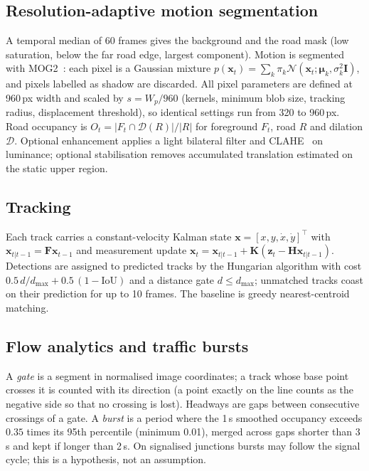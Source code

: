 \documentclass[10pt,twocolumn,a4paper]{article}
\begin{document}
\subsection{Resolution-adaptive motion segmentation}
A temporal median of 60 frames gives the background and the road mask (low saturation, below the far road edge, largest component).
Motion is segmented with MOG2~\cite{zivkovic2004}: each pixel is a Gaussian mixture $p(\mathbf{x}_t)=\sum_k\pi_k\mathcal{N}(\mathbf{x}_t;\boldsymbol\mu_k,\sigma_k^2\mathbf{I})$, and pixels labelled as shadow are discarded.
All pixel parameters are defined at 960\,px width and scaled by $s=W_p/960$ (kernels, minimum blob size, tracking radius, displacement threshold), so identical settings run from 320 to 960\,px.
Road occupancy is $O_t=|F_t\cap\mathcal{D}(R)|/|R|$ for foreground $F_t$, road $R$ and dilation $\mathcal{D}$.
Optional enhancement applies a light bilateral filter and CLAHE~\cite{zuiderveld1994,tomasi1998} on luminance; optional stabilisation removes accumulated translation estimated on the static upper region.

\subsection{Tracking}
Each track carries a constant-velocity Kalman state $\mathbf{x}=[x,y,\dot x,\dot y]^{\top}$ with $\mathbf{x}_{t|t-1}=\mathbf{F}\mathbf{x}_{t-1}$ and measurement update $\mathbf{x}_t=\mathbf{x}_{t|t-1}+\mathbf{K}(\mathbf{z}_t-\mathbf{H}\mathbf{x}_{t|t-1})$.
Detections are assigned to predicted tracks by the Hungarian algorithm with cost $0.5\,d/d_{\max}+0.5\,(1-\mathrm{IoU})$ and a distance gate $d\le d_{\max}$; unmatched tracks coast on their prediction for up to 10 frames.
The baseline is greedy nearest-centroid matching.

\subsection{Flow analytics and traffic bursts}
A \emph{gate} is a segment in normalised image coordinates; a track whose base point crosses it is counted with its direction (a point exactly on the line counts as the negative side so that no crossing is lost).
Headways are gaps between consecutive crossings of a gate. A \emph{burst} is a period where the 1\,s smoothed occupancy exceeds $0.35$ times its 95th percentile (minimum 0.01), merged across gaps shorter than 3\,s and kept if longer than 2\,s.
On signalised junctions bursts may follow the signal cycle; this is a hypothesis, not an assumption.
\end{document}
